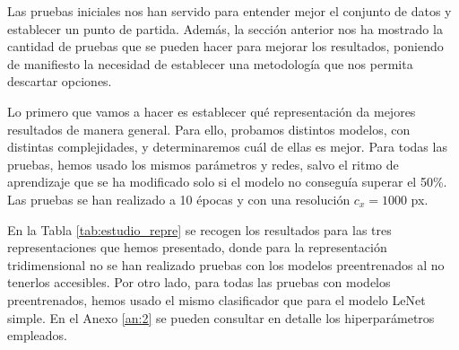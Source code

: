 \documentclass[a4paper,12pt,oneside,titlepage]{book}
\begin{document}
Las pruebas iniciales nos han servido para entender mejor el conjunto de datos y establecer un punto de partida. Además, la sección anterior nos ha mostrado la cantidad de pruebas que se pueden hacer para mejorar los resultados, poniendo de manifiesto la necesidad de establecer una metodología que nos permita descartar opciones.
 
Lo primero que vamos a hacer es establecer qué representación da mejores resultados de manera general. Para ello, probamos distintos modelos, con distintas complejidades, y determinaremos cuál de ellas es mejor. Para todas las pruebas, hemos usado los mismos parámetros y redes, salvo el ritmo de aprendizaje que se ha modificado solo si el modelo no conseguía superar el 50\%. Las pruebas se han realizado a 10 épocas y con una resolución $c_x = 1000$ px.
 
En la Tabla \ref{tab:estudio_repre} se recogen los resultados para las tres representaciones que hemos presentado, donde para la representación tridimensional no se han realizado pruebas con los modelos preentrenados al no tenerlos accesibles. Por otro lado, para todas las pruebas con modelos preentrenados, hemos usado el mismo clasificador que para el modelo LeNet simple. En el Anexo \ref{an:2} se pueden consultar en detalle los hiperparámetros empleados.
\end{document}
